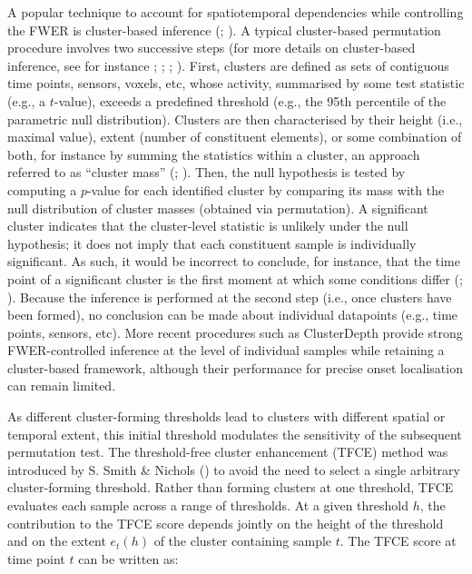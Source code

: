 \documentclass[
  doc,
  floatsintext,
  longtable,
  a4paper,
  nolmodern,
  notxfonts,
  notimes,
  colorlinks=true,linkcolor=blue,citecolor=blue,urlcolor=blue]{apa7}
\begin{document}
A popular technique to account for spatiotemporal dependencies while
controlling the FWER is cluster-based inference
(;
). A typical
cluster-based permutation procedure involves two successive steps (for
more details on cluster-based inference, see for instance
;
; ; ). First, clusters are defined as sets of contiguous
time points, sensors, voxels, etc, whose activity, summarised by some
test statistic (e.g., a \(t\)-value), exceeds a predefined threshold
(e.g., the 95th percentile of the parametric null distribution).
Clusters are then characterised by their height (i.e., maximal value),
extent (number of constituent elements), or some combination of both,
for instance by summing the statistics within a cluster, an approach
referred to as ``cluster mass'' (; ).
Then, the null hypothesis is tested by computing a \(p\)-value for each
identified cluster by comparing its mass with the null distribution of
cluster masses (obtained via permutation). A significant cluster
indicates that the cluster-level statistic is unlikely under the null
hypothesis; it does not imply that each constituent sample is
individually significant. As such, it would be incorrect to conclude,
for instance, that the time point of a significant cluster is the first
moment at which some conditions differ
(;
). Because
the inference is performed at the second step (i.e., once clusters have
been formed), no conclusion can be made about individual datapoints
(e.g., time points, sensors, etc). More recent procedures such as
ClusterDepth provide strong FWER-controlled inference at the level of
individual samples while retaining a cluster-based framework, although
their performance for precise onset localisation can remain limited.

As different cluster-forming thresholds lead to clusters with different
spatial or temporal extent, this initial threshold modulates the
sensitivity of the subsequent permutation test. The threshold-free
cluster enhancement (TFCE) method was introduced by S. Smith \& Nichols
() to avoid the need to select a single
arbitrary cluster-forming threshold. Rather than forming clusters at one
threshold, TFCE evaluates each sample across a range of thresholds. At a
given threshold \(h\), the contribution to the TFCE score depends
jointly on the height of the threshold and on the extent \(e_t(h)\) of
the cluster containing sample \(t\). The TFCE score at time point \(t\)
can be written as:
\end{document}
